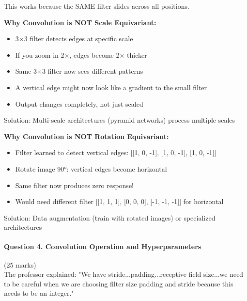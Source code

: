 \documentclass[12pt]{article}
\newcommand{\explanation}[1]{{\color{explanationcolor}#1}}
\begin{document}
\begin{enumerate}[(a)]
{{    This works because the SAME filter slides across all positions.
    }
    
    \textbf{Why Convolution is NOT Scale Equivariant:}
    
    \explanation{
    \begin{itemize}
        \item 3×3 filter detects edges at specific scale
        \item If you zoom in 2×, edges become 2× thicker
        \item Same 3×3 filter now sees different patterns
        \item A vertical edge might now look like a gradient to the small filter
        \item Output changes completely, not just scaled
    \end{itemize}
    
    Solution: Multi-scale architectures (pyramid networks) process multiple scales
    }
    
    \textbf{Why Convolution is NOT Rotation Equivariant:}
    
    \explanation{
    \begin{itemize}
        \item Filter learned to detect vertical edges: [[1, 0, -1], [1, 0, -1], [1, 0, -1]]
        \item Rotate image 90°: vertical edges become horizontal
        \item Same filter now produces zero response!
        \item Would need different filter [[1, 1, 1], [0, 0, 0], [-1, -1, -1]] for horizontal
    \end{itemize}
    
    Solution: Data augmentation (train with rotated images) or specialized architectures
    }
    }
\end{enumerate}

\newpage
\paragraph{Question 4. Convolution Operation and Hyperparameters}{\hfill (25 marks)}\\
The professor explained: "We have stride...padding...receptive field size...we need to be careful when we are choosing filter size padding and stride because this needs to be an integer."
\end{document}
